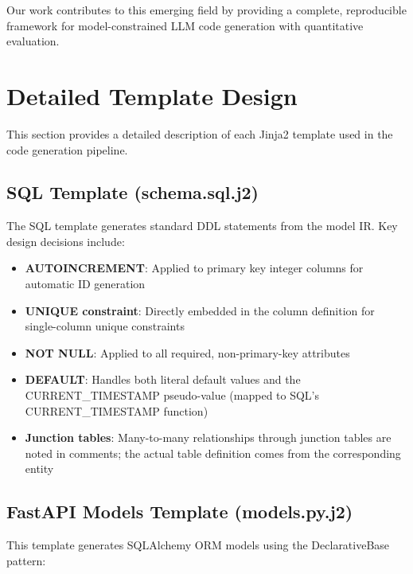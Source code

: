 \documentclass[11pt,a4paper]{article}
\begin{document}
{Our work contributes to this emerging field by providing a complete, reproducible framework for model-constrained LLM code generation with quantitative evaluation.

\newpage
\section{Detailed Template Design}
\label{sec:templates}

This section provides a detailed description of each Jinja2 template used in the code generation pipeline.

\subsection{SQL Template (schema.sql.j2)}

The SQL template generates standard DDL statements from the model IR. Key design decisions include:

\begin{itemize}
    \item \textbf{AUTOINCREMENT}: Applied to primary key integer columns for automatic ID generation
    \item \textbf{UNIQUE constraint}: Directly embedded in the column definition for single-column unique constraints
    \item \textbf{NOT NULL}: Applied to all required, non-primary-key attributes
    \item \textbf{DEFAULT}: Handles both literal default values and the CURRENT\_TIMESTAMP pseudo-value (mapped to SQL's CURRENT\_TIMESTAMP function)
    \item \textbf{Junction tables}: Many-to-many relationships through junction tables are noted in comments; the actual table definition comes from the corresponding entity
\end{itemize}

\subsection{FastAPI Models Template (models.py.j2)}

This template generates SQLAlchemy ORM models using the DeclarativeBase pattern:

}
\end{document}
